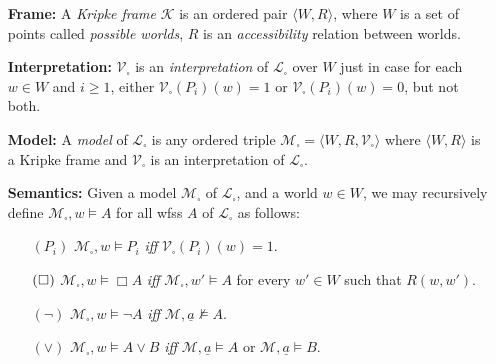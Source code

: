 \documentclass[a4paper, 11pt]{article} %
\newcommand{\tuple}[1]{\langle#1\rangle} %
\newcommand{\set}[1]{\lbrace#1\rbrace} %
\begin{document}
\begin{enumerate}[leftmargin=1.2in,labelsep=.15in] %
\item[\bf Frame:] A \textit{Kripke frame} $\mathcal{K}$ is an ordered pair $\tuple{W,R}$, where $W$ is a set of points called \textit{possible worlds}, $R$ is an \textit{accessibility} relation between worlds.
\item[\bf Interpretation:] $\mathcal{V}_\square$ is an \textit{interpretation} of $\mathcal{L}_\square$ over $W$ just in case for each $w\in W$ and $i\geq1$, either $\mathcal{V}_\square(P_i)(w)=1$ or $\mathcal{V}_\square(P_i)(w)=0$, but not both.
\item[\bf Model:] A \textit{model} of $\mathcal{L}_\square$ is any ordered triple $\mathcal{M}_\square=\tuple{W,R,\mathcal{V}_\square}$ where $\tuple{W,R}$ is a Kripke frame and $\mathcal{V}_\square$ is an interpretation of $\mathcal{L}_\square$.
\item[\bf Semantics:] Given a model $\mathcal{M}_\square$ of $\mathcal{L}_\square$, and a world $w\in W$, we may recursively define $\mathcal{M}_\square,w\vDash A$ for all wfss $A$ of $\mathcal{L}_\square$ as follows:
\begin{small}
\begin{itemize}[leftmargin=.36in]
\item[$(P_i)$] $\mathcal{M}_\square,w\vDash  P_i$ \textit{iff} $\mathcal{V}_\square(P_i)(w)=1$.
\item[$(\hspace{.3pt}\Box\hspace{.3pt})$] $\mathcal{M}_\square,w\vDash  \Box A$ \textit{iff} $\mathcal{M}_\square,w'\vDash A$ for every $w'\in W$ such that $R(w,w')$.
\item[$(\neg)$] $\mathcal{M}_\square,w\vDash  \neg A$ \textit{iff} $\mathcal{M},\underline{a}\nvDash A$.
\item[$(\vee)$] $\mathcal{M}_\square,w\vDash  A\vee B$ \textit{iff} $\mathcal{M},\underline{a}\vDash  A$ or $\mathcal{M},\underline{a}\vDash  B$.

\end{itemize}
\end{small}
\end{enumerate}
\end{document}
